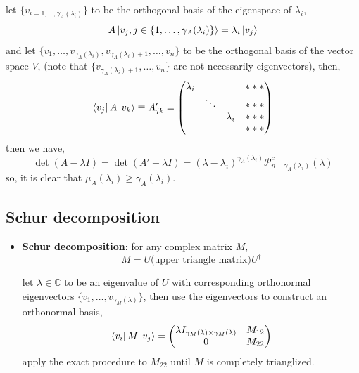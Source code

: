 \begin{itemize}
	\begin{tcolorbox}[title=proof:]
		let $\{v_{i = 1, \dots, \gamma_A(\lambda_i)}\}$ to be the orthogonal basis of the eigenspace of $\lambda_i$,
		\begin{equation}
			A \ket{v_j, j \in \{1, \dots, \gamma_A(\lambda_i)\}} = \lambda_i \ket{v_j}
		\end{equation}
		and let $\{v_1, \dots, v_{\gamma_A(\lambda_i)}, v_{\gamma_A(\lambda_i) + 1}, \dots, v_n\}$ to be the orthogonal basis of the vector space $V$, (note that $\{v_{\gamma_A(\lambda_i) + 1}, \dots, v_n\}$ are not necessarily eigenvectors), then,
		\begin{equation}
			\bra{v_j} A \ket{v_k} \equiv A'_{j k} = \begin{pmatrix}
				\lambda_i & & & *** \\
				& \ddots & & *** \\
				& & \lambda_i & *** \\
				& & & ***
			\end{pmatrix}
		\end{equation}
		then we have,
		\begin{equation}
			\det(A - \lambda I) = \det(A' - \lambda I) = (\lambda - \lambda_i)^{\gamma_A(\lambda_i)} \mathcal{P}^c_{n - \gamma_A(\lambda_i)}(\lambda)
		\end{equation}
		so, it is clear that $\mu_A(\lambda_i) \geq \gamma_A(\lambda_i)$.
	\end{tcolorbox}
\end{itemize}

\subsection{Schur decomposition}
\begin{itemize}
	\item \textbf{Schur decomposition}: for any complex matrix $M$,
	\begin{equation}
		M = U \text{(upper triangle matrix)} U^\dag
	\end{equation}
	
	\begin{tcolorbox}[title=proof:]
		let $\lambda \in \mathbb{C}$ to be an eigenvalue of $U$ with corresponding orthonormal eigenvectors $\{v_1, \dots, v_{\gamma_M(\lambda)}\}$, then use the eigenvectors to construct an orthonormal basis,
		\begin{equation}
			\bra{v_i} M \ket{v_j} = \begin{pmatrix}
				\lambda I_{\gamma_M(\lambda) \times \gamma_M(\lambda)} & M_{1 2} \\
				0 & M_{2 2}
			\end{pmatrix}
		\end{equation}
		apply the exact procedure to $M_{2 2}$ until $M$ is completely trianglized.
	\end{tcolorbox}
\end{itemize}

